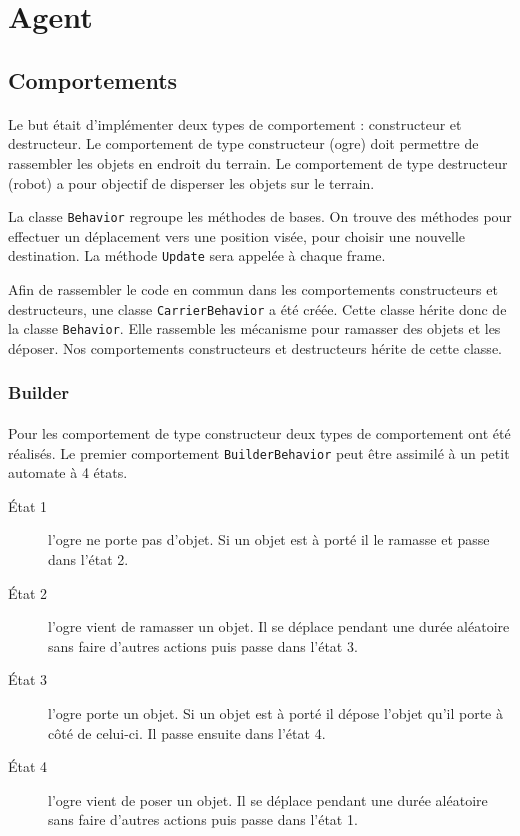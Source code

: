 \section{Agent}

\subsection{Comportements}
\paragraph{}Le but était d'implémenter deux types de comportement :
constructeur et destructeur. Le
comportement de type constructeur (ogre) doit permettre de rassembler les objets
en endroit du terrain. Le comportement de type destructeur (robot) a pour
objectif de disperser les objets sur le terrain.

La classe \texttt{Behavior} regroupe les méthodes de bases. On trouve des
méthodes pour effectuer un déplacement vers une position visée, pour choisir
une nouvelle destination. La méthode \texttt{Update} sera appelée à chaque frame.

Afin de rassembler le code en commun dans les comportements constructeurs et
destructeurs, une classe \texttt{CarrierBehavior} a été créée. Cette classe
hérite donc de la classe \texttt{Behavior}.  Elle rassemble les mécanisme pour
ramasser des objets et les déposer. Nos comportements constructeurs et destructeurs
hérite de cette classe.


\subsubsection{Builder}
\paragraph{}Pour les comportement de type constructeur deux types de comportement ont été
réalisés. Le premier comportement \texttt{BuilderBehavior} peut être assimilé à un petit automate à 4 états.


\begin{description}
    \item[\'Etat 1] l'ogre ne porte pas d'objet. Si un objet est à porté il
        le ramasse et passe dans l'état 2.
    \item[\'Etat 2] l'ogre vient de ramasser un objet. Il se déplace pendant une
        durée aléatoire sans faire d'autres actions puis passe dans l'état 3.
    \item[\'Etat 3] l'ogre porte un objet. Si un objet est à porté il
        dépose l'objet qu'il porte à côté de celui-ci. Il passe ensuite dans
        l'état 4.
    \item[\'Etat 4] l'ogre vient de poser un objet. Il se déplace pendant une
        durée aléatoire sans faire d'autres actions puis passe dans l'état 1.
\end{description}

